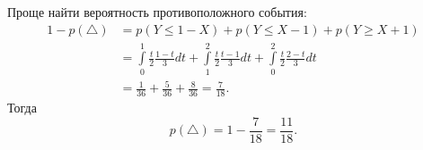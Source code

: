 \documentclass{article}
\begin{document}
Проще найти вероятность противоположного события:
\begin{align*}
1 - p(\triangle) &= p(Y \leqslant 1 - X) + p(Y \leqslant X-1) + p(Y \geqslant X+1)\\
&= \int\limits_0^1 \frac{t}{2} \frac{1-t}{3} dt + \int\limits_1^2 \frac{t}{2} \frac{t-1}{3} dt + \int\limits_0^2 \frac{t}{2} \frac{2-t}{3} dt\\
&= \frac{1}{36} + \frac{5}{36} + \frac{8}{36} = \frac{7}{18}.
\end{align*}
Тогда $$p(\triangle) = 1 - \frac{7}{18} = \frac{11}{18}.$$
\end{document}
